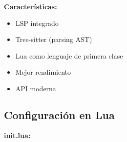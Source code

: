 \documentclass[
  doc,
  floatsintext,
  longtable,
  a4paper,
  nolmodern,
  notxfonts,
  notimes,
  12pt,
  colorlinks=true,linkcolor=blue,citecolor=blue,urlcolor=blue]{apa7}
\providecommand{\tightlist}{%
  \setlength{\itemsep}{0pt}\setlength{\parskip}{0pt}}
\begin{document}
\textbf{Características:}

\begin{itemize}
\tightlist
\item
  LSP integrado
\item
  Tree-sitter (parsing AST)
\item
  Lua como lenguaje de primera clase
\item
  Mejor rendimiento
\item
  API moderna
\end{itemize}

\subsection{Configuración en Lua}\label{configuraciuxf3n-en-lua}

\textbf{init.lua:}
\end{document}
